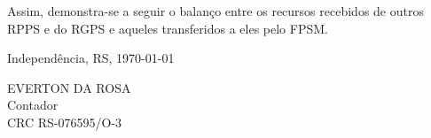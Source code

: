 \documentclass[12pt, a4paper]{article}
\begin{document}
Assim, demonstra-se a seguir o balanço entre os recursos recebidos de outros RPPS e do RGPS e aqueles transferidos a eles pelo FPSM.



\vspace{16pt}

\begin{center}
	Independência, RS, \today
\end{center}

\vspace{36pt}

\begin{center}
	EVERTON DA ROSA\\
	Contador\\
	CRC RS-076595/O-3
\end{center}
\end{document}
